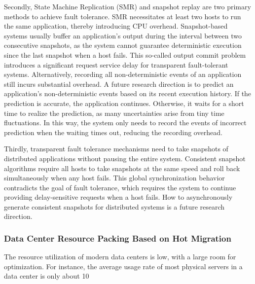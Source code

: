 Secondly, State Machine Replication (SMR) and snapshot replay are two primary methods to achieve fault tolerance. SMR necessitates at least two hosts to run the same application, thereby introducing CPU overhead. Snapshot-based systems usually buffer an application's output during the interval between two consecutive snapshots, as the system cannot guarantee deterministic execution since the last snapshot when a host fails. This so-called output commit problem introduces a significant request service delay for transparent fault-tolerant systems. Alternatively, recording all non-deterministic events of an application still incurs substantial overhead. A future research direction is to predict an application's non-deterministic events based on its recent execution history. If the prediction is accurate, the application continues. Otherwise, it waits for a short time to realize the prediction, as many uncertainties arise from tiny time fluctuations. In this way, the system only needs to record the events of incorrect prediction when the waiting times out, reducing the recording overhead.

Thirdly, transparent fault tolerance mechanisms need to take snapshots of distributed applications without pausing the entire system. Consistent snapshot algorithms require all hosts to take snapshots at the same speed and roll back simultaneously when any host fails. This global synchronization behavior contradicts the goal of fault tolerance, which requires the system to continue providing delay-sensitive requests when a host fails. How to asynchronously generate consistent snapshots for distributed systems is a future research direction.

\subsubsection{Data Center Resource Packing Based on Hot Migration}
\label{future:resource-packing}

The resource utilization of modern data centers is low, with a large room for optimization. For instance, the average usage rate of most physical servers in a data center is only about 10%

